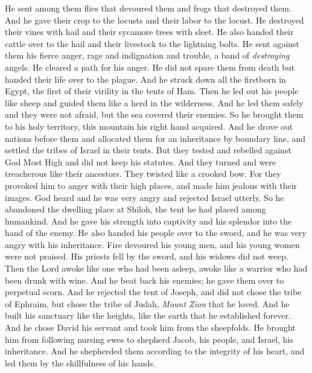 \begin{biblechapter}
\verse He sent among them flies that devoured them 
and frogs that destroyed them.
\verse And he gave their crop to the locusts 
and their labor to the locust.
\verse He destroyed their vines with hail 
and their sycamore trees with sleet.
\verse He also handed their cattle over to the hail 
and their livestock to the lightning bolts.
\verse He sent against them his fierce anger, 
rage and indignation and trouble, 
a band of \textit{destroying} angels.
\verse He cleared a path for his anger. 
He did not spare them from death 
but handed their life over to the plague.
\verse And he struck down all the firstborn in Egypt, 
the first of their virility in the tents of Ham.
\verse Then he led out his people like sheep 
and guided them like a herd in the wilderness.
\verse And he led them safely and they were not afraid, 
but the sea covered their enemies.
\verse So he brought them to his holy territory, 
this mountain his right hand acquired.
\verse And he drove out nations before them 
and allocated them for an inheritance by boundary line, 
and settled the tribes of Israel in their tents.
\verse But they tested and rebelled against God Most High 
and did not keep his statutes.
\verse And they turned and were treacherous like their ancestors. 
They twisted like a crooked bow.
\verse For they provoked him to anger with their high places, 
and made him jealous with their images.
\verse God heard and he was very angry 
and rejected Israel utterly.
\verse So he abandoned the dwelling place at Shiloh, 
the tent he had placed among humankind.
\verse And he gave his strength into captivity 
and his splendor into the hand of the enemy.
\verse He also handed his people over to the sword, 
and he was very angry with his inheritance.
\verse Fire devoured his young men, 
and his young women were not praised.
\verse His priests fell by the sword, 
and his widows did not weep.
\verse Then the Lord awoke like one who had been asleep, 
awoke like a warrior who had been drunk with wine.
\verse And he beat back his enemies; 
he gave them over to perpetual scorn.
\verse And he rejected the tent of Joseph, 
and did not chose the tribe of Ephraim,
\verse but chose the tribe of Judah, 
\textit{Mount Zion} that he loved.
\verse And he built his sanctuary like the heights, 
like the earth that he established forever.
\verse And he chose David his servant 
and took him from the sheepfolds.
\verse He brought him from following nursing ewes 
to shepherd Jacob, his people, 
and Israel, his inheritance.
\verse And he shepherded them according to the integrity of his heart, 
and led them by the skillfulness of his hands.
\end{biblechapter}


